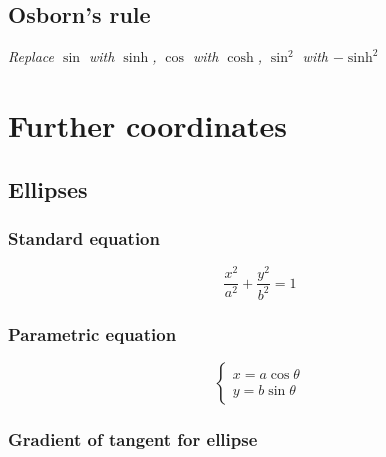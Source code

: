 \documentclass[a4paper,9pt]{scrartcl}
\DeclareMathOperator{\artanh}{artanh}
\begin{document}

    \subsection{Osborn's rule}
    \textit{Replace $\sin$ with $\sinh$, $\cos$ with $\cosh$, $\sin^2$ with $-\sinh^2$}


    \section{Further coordinates}

    \subsection{Ellipses}

    \subsubsection{Standard equation}
    \begin{displaymath}
        \frac{x^2}{a^2} + \frac{y^2}{b^2} = 1
    \end{displaymath}

    \subsubsection{Parametric equation}

    \begin{displaymath}
        \left\{
        \begin{array}{c}
            x = a\cos\theta \\
            y = b\sin\theta
        \end{array}
    \end{displaymath}

    \subsubsection{Gradient of tangent for ellipse}
\end{document}
